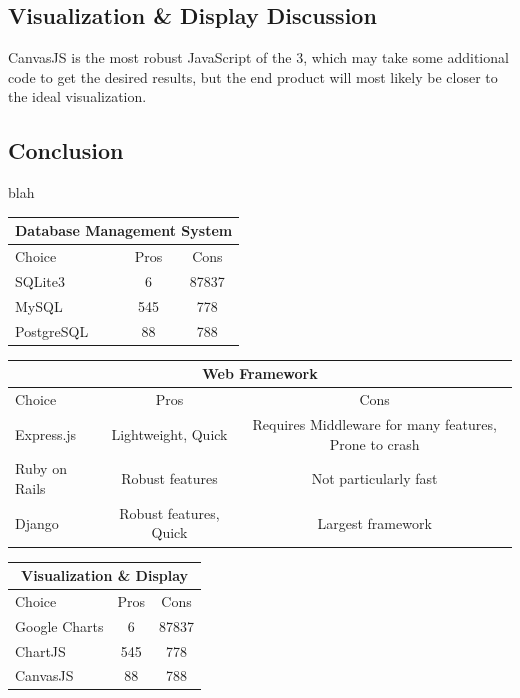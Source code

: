 \documentclass[onecolumn, draftclsnofoot,10pt, compsoc]{IEEEtran}
\begin{document}
\begin{singlespace}
\subsection{Visualization \& Display Discussion}
CanvasJS is the most robust JavaScript of the 3, which may take some additional code to get the desired results, but the end product will most likely be closer to the ideal visualization. 
\subsection{Conclusion}
blah


\begin{center}
 \begin{tabular}{|l|c|c|} 
 \hline
 \multicolumn{3}{|c|}{Database Management System} \\
 \hline
 Choice & Pros & Cons\\ [0.5ex] 
 \hline\hline
 SQLite3 & 6 & 87837 \\ 
 \hline
 MySQL & 545 & 778\\
 \hline
 PostgreSQL & 88 & 788\\ [1ex] 
 \hline
\end{tabular}
 \begin{tabular}{|l|c|c|} 
 \hline
 \multicolumn{3}{|c|}{Web Framework} \\
 \hline
 Choice & Pros & Cons\\ [0.5ex] 
 \hline\hline
 Express.js & Lightweight, Quick & Requires Middleware for many features, Prone to crash \\ 
 \hline
 Ruby on Rails & Robust features & Not particularly fast\\
 \hline
 Django & Robust features, Quick & Largest framework\\ [1ex] 
 \hline
\end{tabular}
 \begin{tabular}{|l|c|c|} 
 \hline
 \multicolumn{3}{|c|}{Visualization \& Display} \\
 \hline
 Choice & Pros & Cons\\ [0.5ex] 
 \hline\hline
 Google Charts & 6 & 87837 \\ 
 \hline
 ChartJS & 545 & 778\\
 \hline
 CanvasJS & 88 & 788\\ [1ex] 
 \hline
\end{tabular}
\end{center}





\end{singlespace}
\end{document}
